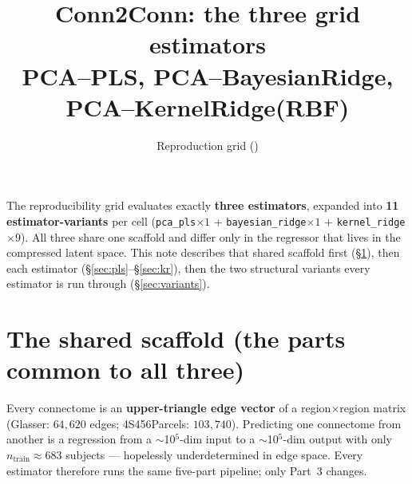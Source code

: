 \documentclass[11pt]{article}
\title{\textbf{Conn2Conn: the three grid estimators}\\[2pt]
\large PCA--PLS, PCA--BayesianRidge, PCA--KernelRidge(RBF)}
\author{Reproduction grid (\code{reproduction/\_grid\_common.py})}
\date{}
\newcommand{\code}[1]{\texttt{#1}}
\begin{document}
\maketitle

\noindent
The reproducibility grid evaluates exactly \textbf{three estimators}, expanded into
\textbf{11 estimator-variants} per cell (\code{pca\_pls}$\times1$ + \code{bayesian\_ridge}$\times1$
+ \code{kernel\_ridge}$\times9$). All three share one scaffold and differ only in the regressor
that lives in the compressed latent space. This note describes that shared scaffold first
(\S\ref{sec:scaffold}), then each estimator (\S\ref{sec:pls}--\S\ref{sec:kr}), then the
two structural variants every estimator is run through (\S\ref{sec:variants}).

\section{The shared scaffold (the parts common to all three)}\label{sec:scaffold}

Every connectome is an \textbf{upper-triangle edge vector} of a region$\times$region matrix
(Glasser: $64{,}620$ edges; 4S456Parcels: $103{,}740$). Predicting one connectome from another
is a regression from a $\sim$10$^5$-dim input to a $\sim$10$^5$-dim output with only
$n_{\mathrm{train}}\!\approx\!683$ subjects --- hopelessly underdetermined in edge space. Every
estimator therefore runs the same five-part pipeline; only Part~3 changes.
\end{document}
